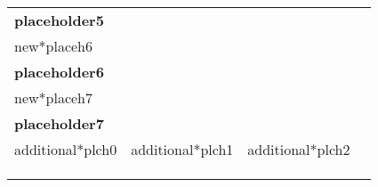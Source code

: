 \documentclass{article}
\begin{document}
\begin{table}[t]
{\begin{tabularx}{\textwidth}{|Xccll|c|}
\multicolumn{5}{|l|}{\textbf{placeholder5}}                                                       &                                             \\
\multicolumn{5}{|l|}{new*placeh6}                                                                           &                                             \\
\multicolumn{5}{|l|}{\textbf{placeholder6}}                                                             &                                             \\
\multicolumn{5}{|l|}{new*placeh7}                                                                                           &                                             \\
\multicolumn{5}{|l|}{\textbf{placeholder7}}                                                                                               &                                             \\ \cline{1-5}
\multicolumn{3}{|l|}{additional*plch0} & \multicolumn{1}{l|}{additional*plch1}           & additional*plch2  \hspace{20px}          &                                             \\ \cline{1-5}
\multicolumn{3}{|l|}{\multirow{3}{*}{}}                    & \multicolumn{1}{l|}{\multirow{3}{*}{}} & \multirow{3}{*}{} &                                             \\
\multicolumn{3}{|l|}{}                                     & \multicolumn{1}{l|}{}                  &                   &                                             \\
\multicolumn{3}{|l|}{}                                     & \multicolumn{1}{l|}{}                               &                   &                                             \\ \hline
\end{tabularx}
}
\end{table}
\end{document}
